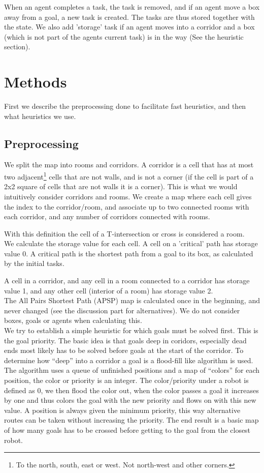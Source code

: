 \documentclass[letterpaper]{article}
\begin{document}
When an agent completes a task, the task is removed, and if an agent move a box away from
a goal, a new task is created. The tasks are thus stored together with the state.
We also add 'storage' task if an agent moves into a corridor and a box (which is not
part of the agents current task) is in the way (See the heuristic section).

\section{Methods}
First we describe the preprocessing done to facilitate fast heuristics, and then
what heuristics we use.

\subsection{Preprocessing}
We split the map into rooms and corridors. A corridor is a cell that has at most
two adjacent\footnote{To the north, south, east or west. Not north-west and other corners.} cells that are not walls, and is not a corner (if the cell is part of
a 2x2 square of cells that are not walls it is a corner). This is what we would
intuitively consider corridors and rooms. We create a map where each cell gives
the index to the corridor/room, and associate up to two connected rooms with each corridor,
and any number of corridors connected with rooms.

With this definition the cell of a T-intersection or cross is considered a room.\\

We calculate the storage value for each cell. A cell on a 'critical' path has storage
value 0. A critical path is the shortest path from a goal to its box, as calculated
by the initial tasks.

A cell in a corridor, and any cell in a room connected to a corridor has storage
value 1, and any other cell (interior of a room) has storage value 2.\\

The All Pairs Shortest Path (APSP) map is calculated once in the beginning, and never changed (see the discussion
part for alternatives). We do not consider boxes, goals or agents when calculating
this.\\

We try to establish a simple heuristic for which goals must be solved first.
This is the goal priority. The basic idea is that goals deep in coridors,
especially dead ends most likely has to be solved before goals at the start of
the corridor. To determine how ``deep'' into a corridor a goal is a flood-fill
like algorithm is used. The algorithm uses a queue of unfinished positions and a
map of ``colors'' for each position, the color or priority is an integer.
The color/priority under a robot is defined as 0, we then flood the color out,
when the color passes a goal it increases by one and thus colors the goal with
the new priority and flows on with this new value. A position is always given
the minimum priority, this way alternative routes can be taken without
increasing the priority. The end result is a basic map of how many goals has to
be crossed before getting to the goal from the closest robot.
\end{document}
